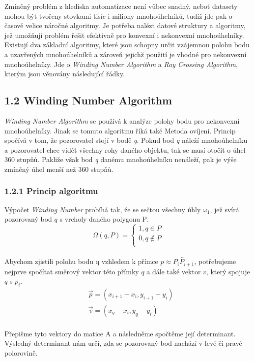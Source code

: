 \noindent Zmíněný problém z hlediska automatizace není vůbec snadný, neboť datasety mohou být tvořeny stovkami tisíc i miliony mnohoúhelníků, tudíž jde pak o časově velice náročné algoritmy. Je potřeba nalézt datové struktury a algoritmy, jež umožňují problém řešit efektivně pro konvexní i nekonvexní mnohoúhelníky. Existují dva základní algoritmy, které jsou schopny určit vzájemnou polohu bodu a uzavřených mnohoúhelníků a zároveň jejichž použití je vhodné pro nekonvexní mnohoúhelníky. Jde o \textit{Winding Number Algorithm} a \textit{Ray Crossing Algorithm}, kterým jsou věnovány následující řádky.

\subsection*{1.2 Winding Number Algorithm}
\textit{Winding Number Algorithm} se používá k analýze polohy bodu pro nekonvexní mnohoúhelníky. Jinak se tomuto algoritmu říká také Metoda ovíjení. Princip spočívá v tom, že pozorovatel stojí v bodě \textit{q}. Pokud bod \textit{q} náleží mnohoúhelníku a pozorovatel chce vidět všechny rohy daného objektu, tak se musí otočit o úhel 360 stupňů. Pakliže však bod \textit{q} danému mnohoúhelníku nenáleží, pak je výše zmíněný úhel menší než 360 stupňů. 

\subsubsection*{1.2.1 Princip algoritmu}
\noindent Výpočet \textit{Winding Number} probíhá tak, že se sečtou všechny úhly $\omega_1$, jež svírá pozorovaný bod $q$ s vrcholy daného polygonu P.\\ 

\begin{equation*}
\Omega (q,P)= \begin{cases}
    1, q  \in P \\
    0, q  \notin P\\
\end{cases}
\end{equation*}\\

 \noindent Abychom zjistili polohu bodu q vzhledem k přímce  $p \approx \overleftrightarrow{P_iP_{i+1}}$,  potřebujeme nejprve spočítat směrový vektor této přímky $q$ a dále také vektor $v$, který spojuje $q$ s $p_i$.\\
 \begin{align}
    \nonumber&\vec{p}=(x_{i+1}-x_i,y_{i+1}-y_i)\\
    \nonumber&\vec{v}=(x_q-x_i,y_q-y_i)
\end{align}\\
Přepišme tyto vektory do matice A a následněme spočtěme její determinant. Výsledný determinant nám určí, zda se pozorovaný bod nachází v levé či pravé polorovině.\\


